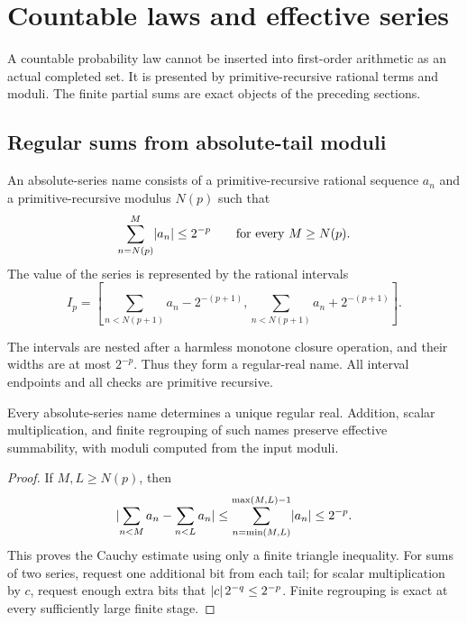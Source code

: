 \section{Countable laws and effective series}\label{sec:countable}

A countable probability law cannot be inserted into first-order arithmetic as
an actual completed set.  It is presented by primitive-recursive rational
terms and moduli.  The finite partial sums are exact objects of the preceding
sections.

\subsection{Regular sums from absolute-tail moduli}

\begin{definition}\label{def:abs-series}
An absolute-series name consists of a primitive-recursive rational sequence
\(a_n\) and a primitive-recursive modulus \(N(p)\) such that
\[
 \sum_{n=N(p)}^{M}\lvert a_n\rvert\le2^{-p}
 \qquad\text{for every }M\ge N(p).
\]
The value of the series is represented by the rational intervals
\[
 I_p=\left[\sum_{n<N(p+1)}a_n-2^{-(p+1)},
          \sum_{n<N(p+1)}a_n+2^{-(p+1)}\right].
\]
\end{definition}

The intervals are nested after a harmless monotone closure operation, and
their widths are at most \(2^{-p}\).  Thus they form a regular-real name.  All
interval endpoints and all checks are primitive recursive.

\begin{theorem}\label{thm:abs-convergence}
Every absolute-series name determines a unique regular real.  Addition,
scalar multiplication, and finite regrouping of such names preserve effective
summability, with moduli computed from the input moduli.
\end{theorem}

\begin{proof}
If \(M,L\ge N(p)\), then
\[
 \lvert \sum_{n<M}a_n-\sum_{n<L}a_n\rvert
 \le\sum_{n=\min(M,L)}^{\max(M,L)-1}\lvert a_n\rvert
 \le2^{-p}.
\]
This proves the Cauchy estimate using only a finite triangle inequality.
For sums of two series, request one additional bit from each tail; for scalar
multiplication by \(c\), request enough extra bits that
\(\lvert c\rvert\,2^{-q}\le2^{-p}\).  Finite regrouping is exact at every sufficiently
large finite stage.
\end{proof}

